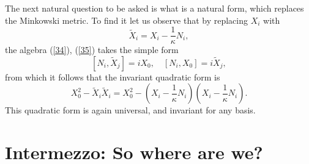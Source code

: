 \documentclass [prd,twocolumn,nofootinbib,showpacs]  {revtex4}
\begin{document}
The next natural question to be asked is what is a natural form,
which replaces the Minkowski metric.  To find it let us observe
that by replacing $X_i$ with
\begin{equation}\label{tx}
\tilde{X}_i = X_i - \frac1\kappa N_i,
\end{equation}
 the algebra (\ref{34}), (\ref{35}) takes the simple form
\begin{equation}\label{39}
[N_i, \tilde{X}_j] = i X_0, \quad [N_i, X_0]= i \tilde{X}_j,
\end{equation}
from which it follows that the invariant quadratic form is
\begin{equation}\label{40}
X_0^2 - \tilde{X}_i\tilde{X}_i = X_0^2 -\left(X_i - \frac1\kappa N_i\right)\left(X_i - \frac1\kappa N_i\right).
\end{equation}
This quadratic form is again universal, and invariant for any
basis.

\section{Intermezzo: So where are we?}
\end{document}
